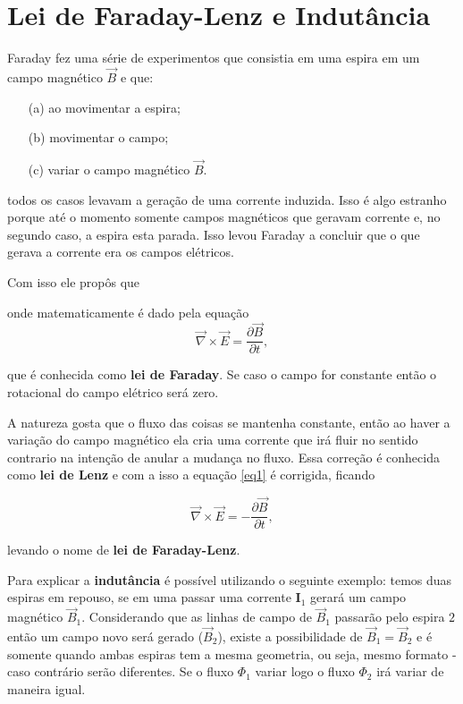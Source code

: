 \newpage\section{Lei de Faraday-Lenz e Indutância}Faraday fez uma série de experimentos que consistia em uma espira em um campo magnético $\vec{B}$ e que:

\begin{enumerate}
    \item[(a)] ao movimentar a espira;
    \item[(b)] movimentar o campo;
    \item[(c)]variar o campo magnético $\vec{B}$.
\end{enumerate}
todos os casos levavam a geração de uma corrente induzida. Isso é algo estranho porque até o momento somente campos magnéticos que geravam corrente e, no segundo caso, a espira esta parada. Isso levou  Faraday a concluir que o que gerava a corrente era os campos elétricos.




Com isso ele propôs que
\begin{quote}
\begin{center}
\end{center}
\end{quote}

onde matematicamente é dado pela equação
\begin{equation} \label{eq1}
    {\vec{\nabla} \times \vec{E} = \frac{\partial \vec{B}}{\partial t},}
\end{equation}

que é conhecida como \textbf{lei de Faraday}. Se caso o campo for constante então o rotacional do campo elétrico será zero. 

A natureza gosta que o fluxo das coisas se mantenha constante, então ao haver a variação do campo magnético ela cria uma corrente que irá fluir no sentido contrario na intenção de anular a mudança no fluxo. Essa correção é conhecida como \textbf{lei de Lenz} e com a isso a equação \ref{eq1} é corrigida, ficando 

\begin{equation} \label{eq2}
    \boxed{\vec{\nabla} \times \vec{E} = -\frac{\partial \vec{B}}{\partial t},}
\end{equation}

levando o nome de \textbf{lei de Faraday-Lenz}.

Para explicar a \textbf{indutância} é possível utilizando o seguinte exemplo: temos duas espiras em repouso, se em uma passar uma corrente \(\mathbf{I}_1\) gerará um campo magnético \(\vec{B}_1\). Considerando que as linhas de campo de \(\vec{B}_1\) passarão pelo espira $2$ então um campo novo será gerado (\(\vec{B}_2\)), existe a possibilidade de $\vec{B}_1 = \vec{B}_2$ e é somente quando ambas espiras tem a mesma geometria, ou seja, mesmo formato - caso contrário serão diferentes. Se o fluxo $\Phi_1 $ variar logo o fluxo $\Phi_2$ irá variar de maneira igual. 
